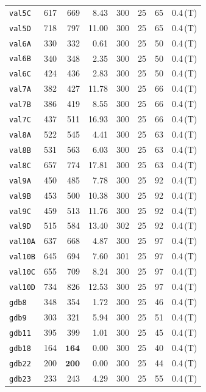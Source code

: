 \begin{longtable}{lrrrrrrl}
\texttt{val5C} & 617 & 669 & 8.43 & 300 & 25 & 65 & 0.4\,(T) \\
\texttt{val5D} & 718 & 797 & 11.00 & 300 & 25 & 65 & 0.4\,(T) \\
\texttt{val6A} & 330 & 332 & 0.61 & 300 & 25 & 50 & 0.4\,(T) \\
\texttt{val6B} & 340 & 348 & 2.35 & 300 & 25 & 50 & 0.4\,(T) \\
\texttt{val6C} & 424 & 436 & 2.83 & 300 & 25 & 50 & 0.4\,(T) \\
\texttt{val7A} & 382 & 427 & 11.78 & 300 & 25 & 66 & 0.4\,(T) \\
\texttt{val7B} & 386 & 419 & 8.55 & 300 & 25 & 66 & 0.4\,(T) \\
\texttt{val7C} & 437 & 511 & 16.93 & 300 & 25 & 66 & 0.4\,(T) \\
\texttt{val8A} & 522 & 545 & 4.41 & 300 & 25 & 63 & 0.4\,(T) \\
\texttt{val8B} & 531 & 563 & 6.03 & 300 & 25 & 63 & 0.4\,(T) \\
\texttt{val8C} & 657 & 774 & 17.81 & 300 & 25 & 63 & 0.4\,(T) \\
\texttt{val9A} & 450 & 485 & 7.78 & 300 & 25 & 92 & 0.4\,(T) \\
\texttt{val9B} & 453 & 500 & 10.38 & 300 & 25 & 92 & 0.4\,(T) \\
\texttt{val9C} & 459 & 513 & 11.76 & 300 & 25 & 92 & 0.4\,(T) \\
\texttt{val9D} & 515 & 584 & 13.40 & 302 & 25 & 92 & 0.4\,(T) \\
\texttt{val10A} & 637 & 668 & 4.87 & 300 & 25 & 97 & 0.4\,(T) \\
\texttt{val10B} & 645 & 694 & 7.60 & 301 & 25 & 97 & 0.4\,(T) \\
\texttt{val10C} & 655 & 709 & 8.24 & 300 & 25 & 97 & 0.4\,(T) \\
\texttt{val10D} & 734 & 826 & 12.53 & 300 & 25 & 97 & 0.4\,(T) \\
\texttt{gdb8} & 348 & 354 & 1.72 & 300 & 25 & 46 & 0.4\,(T) \\
\texttt{gdb9} & 303 & 321 & 5.94 & 300 & 25 & 51 & 0.4\,(T) \\
\texttt{gdb11} & 395 & 399 & 1.01 & 300 & 25 & 45 & 0.4\,(T) \\
\texttt{gdb18} & 164 & $\mathbf{164}$ & 0.00 & 300 & 25 & 40 & 0.4\,(T) \\
\texttt{gdb22} & 200 & $\mathbf{200}$ & 0.00 & 300 & 25 & 44 & 0.4\,(T) \\
\texttt{gdb23} & 233 & 243 & 4.29 & 300 & 25 & 55 & 0.4\,(T) \\

\end{longtable}
